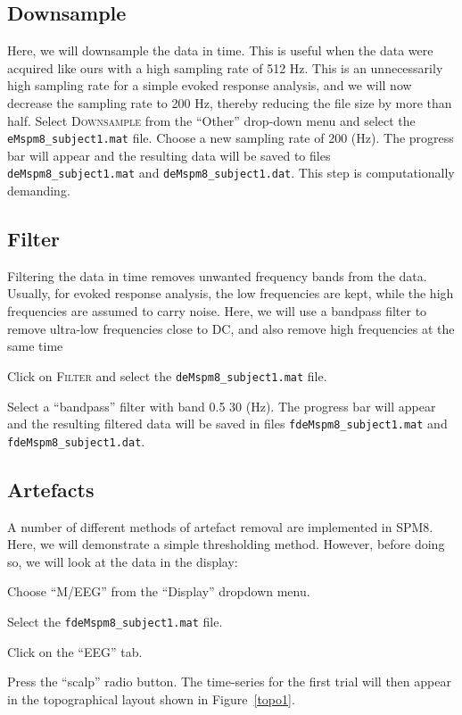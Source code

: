 \subsection{Downsample}
Here, we will downsample the data in time. This is useful when the data were acquired like ours with a high sampling rate of 512 Hz. This is an unnecessarily high sampling rate for a simple evoked response analysis, and we will now decrease the sampling rate to 200 Hz, thereby reducing the file size by more than half. Select \textsc{Downsample} from the ``Other'' drop-down menu and select the \texttt{eMspm8\_subject1.mat} file. Choose a new sampling rate of 200 (Hz). The progress bar will appear and the resulting data will be saved to files \texttt{deMspm8\_subject1.mat} and \texttt{deMspm8\_subject1.dat}. This step is computationally demanding.

\subsection{Filter}
Filtering the data in time removes unwanted frequency bands from the data. Usually, for evoked response analysis, the low frequencies are kept, while the high frequencies are assumed to carry noise. Here, we will use a bandpass filter to remove ultra-low frequencies close to DC, and also remove high frequencies at the same time
\bi
\item{Click on \textsc{Filter} and select the \texttt{deMspm8\_subject1.mat} file.}
\item{Select a ``bandpass'' filter with band 0.5 30 (Hz).}
\ei
The progress bar will appear and the resulting filtered data will be saved in files \texttt{fdeMspm8\_subject1.mat} and \texttt{fdeMspm8\_subject1.dat}.

\subsection{Artefacts}
 A number of different methods of artefact removal are implemented in SPM8. Here, we will demonstrate a simple thresholding method. However, before doing so, we will look at the data in the display:
\bi
\item{Choose ``M/EEG'' from the ``Display'' dropdown menu.}
\item{Select the \texttt{fdeMspm8\_subject1.mat} file.}
\item{Click on the ``EEG'' tab.}
\item{Press the ``scalp'' radio button.}
\ei
The time-series for the first trial will then appear in the topographical layout shown in Figure~\ref{topo1}.

